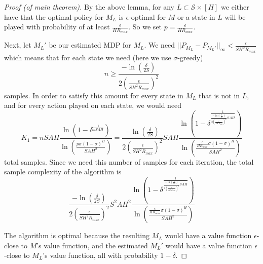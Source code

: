 \documentclass[12pt, letterpaper]{article}
\theoremstyle{definition}
\theoremstyle{remark}
\begin{document}
\begin{proof}[Proof (of main theorem)]
    By the above lemma, for any \(L \subset \mathcal{S} \times [H]\) we either have that the optimal policy for \(M_L\) is \(\epsilon\)-optimal for \(M\) or a state in \(L\) will  be played with probability of at least \(\frac{\epsilon}{HR_{max}}\). So we set \(p = \frac{\epsilon}{HR_{max}}\).

    Next, let \(M_L'\) be our estimated MDP for \(M_L\). We need \(||P_{M_L} - P_{M_{L}'}||_{\infty} < \frac{\epsilon}{SH^2 R_{max}}\) which means that for each state we need (here we use \(\sigma\)-greedy)
    \[n \geq \frac{-\ln(\frac{\delta}{2S})}{2(\frac{\epsilon}{SH^2 R_{max}})^2}\]
    samples. In order to satisfy this amount for every state in \(M_L\) that is not in \(L\), and for every action played on each state, we would need
    \[K_1 = nSAH \frac{\ln(1 - \delta^{\frac{1}{nSAH}})}{\ln(\frac{p\sigma (1 - \sigma)^{H}}{SAH^2})} = \frac{-\ln(\frac{\delta}{2S})}{2(\frac{\epsilon}{SH^2 R_{max}})^2} SAH \frac{\ln(1 - \delta^{\frac{1}{\frac{-\ln(\frac{\delta}{2S})}{2(\frac{\epsilon}{SH^2 R_{max}})^2} SAH}})}{\ln(\frac{\frac{\epsilon}{HR_{max}} \sigma (1 - \sigma)^{H}}{SAH^2})}\]
    total samples. Since we need this number of samples for each iteration, the total sample complexity of the algorithm is
    \[\frac{-\ln(\frac{\delta}{2S})}{2(\frac{\epsilon}{SH^2 R_{max}})^2} S^2AH^2 \frac{\ln(1 - \delta^{\frac{1}{\frac{-\ln(\frac{\delta}{2S})}{2(\frac{\epsilon}{SH^2 R_{max}})^2} SAH}})}{\ln(\frac{\frac{\epsilon}{HR_{max}} \sigma (1 - \sigma)^{H}}{SAH^2})}\]

    The algorithm is optimal because the resulting \(M_L\) would have a value function \(\epsilon\)-close to \(M\)'s value function, and the estimated \(M_{L}'\) would have a value function \(\epsilon\)-close to \(M_L\)'s value function, all with probability \(1-\delta\).
\end{proof}
\end{document}
